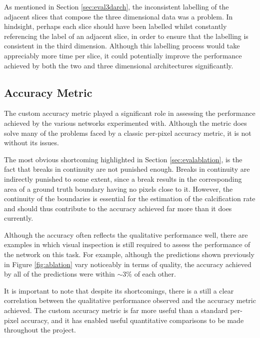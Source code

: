 As mentioned in Section \ref{sec:eval3darch}, the inconsistent labelling of the adjacent slices that compose the three dimensional data was a problem. In hindsight, perhaps each slice should have been labelled whilst constantly referencing the label of an adjacent slice, in order to ensure that the labelling is consistent in the third dimension. Although this labelling process would take appreciably more time per slice, it could potentially improve the performance achieved by both the two and three dimensional architectures significantly.

\subsection{Accuracy Metric}
\label{sec:evalaccuracy}

The custom accuracy metric played a significant role in assessing the performance achieved by the various networks experimented with. Although the metric does solve many of the problems faced by a classic per-pixel accuracy metric, it is not without its issues.

The most obvious shortcoming highlighted in Section \ref{sec:evalablation}, is the fact that breaks in continuity are not punished enough. Breaks in continuity are indirectly punished to some extent, since a break results in the corresponding area of a ground truth boundary having no pixels close to it. However, the continuity of the boundaries is essential for the estimation of the calcification rate and should thus contribute to the accuracy achieved far more than it does currently.

Although the accuracy often reflects the qualitative performance well, there are examples in which visual inspection is still required to assess the performance of the network on this task. For example, although the predictions shown previously in Figure \ref{fig:ablation} vary noticeably in terms of quality, the accuracy achieved by all of the predictions were within ${\sim}3\%$ of each other.

It is important to note that despite its shortcomings, there is a still a clear correlation between the qualitative performance observed and the accuracy metric achieved. The custom accuracy metric is far more useful than a standard per-pixel accuracy, and it has enabled useful quantitative comparisons to be made throughout the project.


